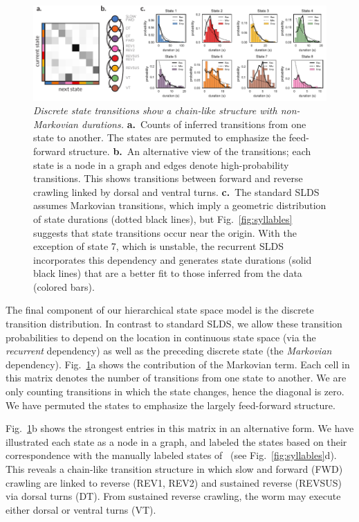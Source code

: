 \documentclass[11pt]{article}
\begin{document}
\begin{figure}[t!]
\centering
\includegraphics[width=6in]{figures/v3/figure6} 
\caption{ \textit{Discrete state transitions show a chain-like structure
    with non-Markovian durations.}  \textbf{a.}~Counts of inferred transitions
  from one state to another. The states are permuted to emphasize the
  feed-forward structure.  \textbf{b.}~An alternative view of the
  transitions; each state is a node in a graph and edges denote
  high-probability transitions.  This shows transitions between
  forward and reverse crawling linked by dorsal and ventral turns.
  \textbf{c.}~The standard SLDS assumes Markovian transitions, which
  imply a geometric distribution of state durations (dotted black
  lines), but Fig.~\ref{fig:syllables} suggests that state
  transitions occur near the origin.  With the exception of state 7,
  which is unstable, the recurrent SLDS incorporates
  this dependency and generates state durations (solid black lines)
  that are a better fit to those inferred from the data (colored
  bars).  }
\label{fig:recurrent}
\end{figure}

The final component of our hierarchical state space model is the
discrete transition distribution.  In contrast to standard SLDS, we
allow these transition probabilities to depend on the location in
continuous state space (via the \emph{recurrent} dependency) as well as
the preceding discrete state (the \emph{Markovian} dependency).
Fig.~\ref{fig:recurrent}a shows the contribution of the Markovian
term.  Each cell in this matrix denotes the number of transitions from
one state to another. We are only counting transitions in which the
state changes, hence the diagonal is zero.  We have permuted the
states to emphasize the largely feed-forward structure.

Fig.~\ref{fig:recurrent}b shows the strongest entries in this matrix
in an alternative form.  We have illustrated each state as a node in a
graph, and labeled the states based on their correspondence with the
manually labeled states of~\citet{kato2015global} (see
Fig.~\ref{fig:syllables}d).  This reveals a chain-like transition
structure in which slow and forward (\textsf{FWD}) crawling are linked
to reverse (\textsf{REV1}, \textsf{REV2}) and sustained reverse
(\textsf{REVSUS}) via dorsal turns (\textsf{DT}). From sustained
reverse crawling, the worm may execute either dorsal or ventral turns
(\textsf{VT}).
\end{document}

